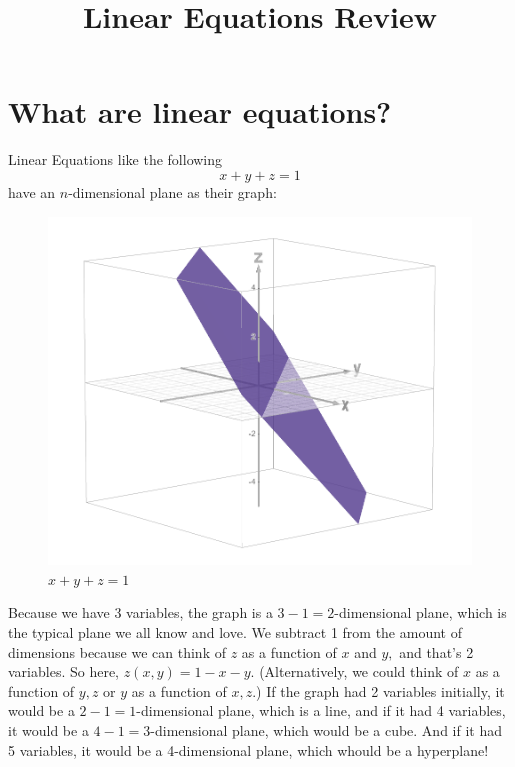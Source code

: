 \documentclass[12pt]{scrartcl}
\title{\vspace{-2em} Linear Equations Review}
\author{}
\date{}
\begin{document}
\maketitle
\vspace{-6em}

\section*{What are linear equations?}
Linear Equations like the following
\[x + y + z = 1\]
have an $n$-dimensional plane as their graph:
\begin{figure}[H]
    \centering
    \includegraphics[scale=0.6]{x + y + z = 1.png}
    \caption*{$x + y + z = 1$}
\end{figure}
Because we have 3 variables, the graph is a $3-1=2$-dimensional plane, which is the typical plane we all know and love. We subtract 1 from the amount of dimensions because we can think of $z$ as a function of $x$ and $y,$ and that's 2 variables. So here, $z(x,y) = 1 - x - y.$ (Alternatively, we could think of $x$ as a function of $y,z$ or $y$ as a function of $x,z.$) If the graph had 2 variables initially, it would be a $2-1=1$-dimensional plane, which is a line, and if it had 4 variables, it would be a $4-1=3$-dimensional plane, which would be a cube. And if it had 5 variables, it would be a 4-dimensional plane, which whould be a hyperplane!
\end{document}

